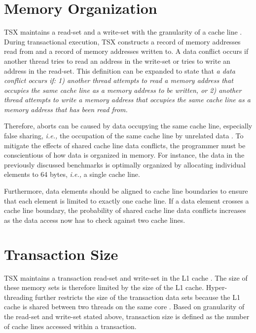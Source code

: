 \documentclass[11pt]{book}
\begin{document}
\section{Memory Organization}

TSX maintains a read-set and a write-set with the granularity of a cache line
\cite{intel_prog_ref}.  During transactional execution, TSX constructs a record of memory
addresses read from and a record of memory addresses written to.  A data conflict occurs
if another thread tries to read an address in the write-set or tries to write an address
in the read-set.  This definition can be expanded to state that \emph{a data conflict
  occurs if: 1) another thread attempts to read a memory address that occupies the same
  cache line as a memory address to be written, or 2) another thread attempts to write a
  memory address that occupies the same cache line as a memory address that has been read
  from.}

Therefore, aborts can be caused by data occupying the same cache line, especially false
sharing, \emph{i.e.,} the occupation of the same cache line by unrelated data
\cite{intel_opt_man}.  To mitigate the effects of shared cache line data conflicts, the
programmer must be conscientious of how data is organized in memory.  For instance, the
data in the previously discussed benchmarks is optimally organized by allocating
individual elements to 64 bytes, \emph{i.e.,} a single cache line.

Furthermore, data elements should be aligned to cache line boundaries to ensure that each
element is limited to exactly one cache line.  If a data element crosses a cache line
boundary, the probability of shared cache line data conflicts increases as the data access
now has to check against two cache lines.

\section{Transaction Size}

TSX maintains a transaction read-set and write-set in the L1 cache
\cite{intel_opt_man}.  The size of these memory sets is therefore limited by the
size of the L1 cache.  Hyper-threading further restricts the size of the
transaction data sets because the L1 cache is shared between two threads on the
same core \cite{intel_opt_man}.  Based on granularity of the read-set and
write-set stated above, transaction size is defined as the number of cache lines
accessed within a transaction.
\end{document}
